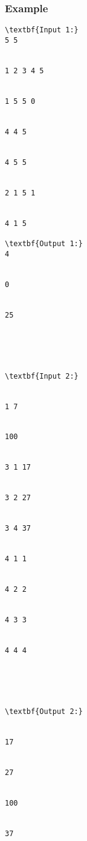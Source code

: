 \subsubsection{   Example  }
\begin{verbatim}
\textbf{Input 1:}
5 5 


1 2 3 4 5 


1 5 5 0 


4 4 5 


4 5 5 


2 1 5 1 


4 1 5

\textbf{Output 1:}
4


0


25 





\textbf{Input 2:}


1 7 


100 


3 1 17 


3 2 27 


3 4 37 


4 1 1 


4 2 2 


4 3 3 


4 4 4





\textbf{Output 2:}


17 


27 


100


37


\end{verbatim}
